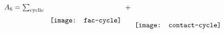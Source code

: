 \documentclass{standalone}
\begin{document}
$
	A_6=\sum_{\text{cyclic}}~~\raisebox{-6.5mm}{\texttt{[image: fac-cycle]}}~+~\raisebox{-8.9mm}{\texttt{[image: contact-cycle]}}
$
\end{document}
